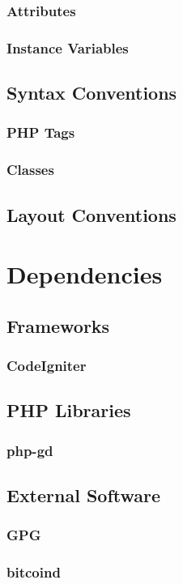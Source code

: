 \documentclass[11pt]{article} %
\begin{document}
\subsubsection{Attributes}
\subsubsection{Instance Variables}
\subsection{Syntax Conventions}
\subsubsection{PHP Tags}
\subsubsection{Classes}
\subsection{Layout Conventions}
\newpage

\section{Dependencies}
\subsection{Frameworks}
\subsubsection{CodeIgniter}
\subsection{PHP Libraries}
\subsubsection{php-gd}
\subsection{External Software}
\subsubsection{GPG}
\subsubsection{bitcoind}
\newpage
\end{document}

